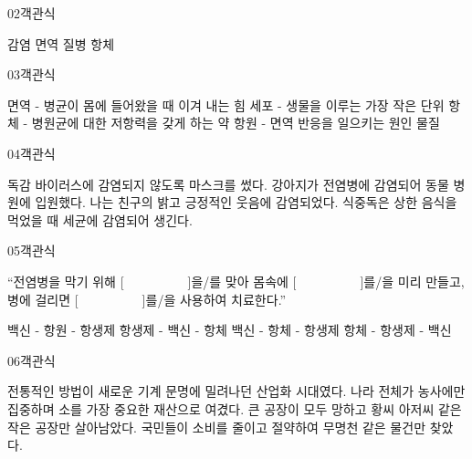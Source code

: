 \documentclass[fs95,seriesFre]{korfarm-base}
\begin{document}
\begin{kfQBlock}{02}{객관식}
\begin{kfChoices}
\kfChoice 감염
\kfChoice 면역
\kfChoice 질병
\kfChoice 항체
\end{kfChoices}
\end{kfQBlock}

\begin{kfQBlock}{03}{객관식}
\begin{kfChoices}
\kfChoice 면역 - 병균이 몸에 들어왔을 때 이겨 내는 힘
\kfChoice 세포 - 생물을 이루는 가장 작은 단위
\kfChoice 항체 - 병원균에 대한 저항력을 갖게 하는 약
\kfChoice 항원 - 면역 반응을 일으키는 원인 물질
\end{kfChoices}
\end{kfQBlock}

\begin{kfQBlock}{04}{객관식}
\begin{kfChoices}
\kfChoice 독감 바이러스에 감염되지 않도록 마스크를 썼다.
\kfChoice 강아지가 전염병에 감염되어 동물 병원에 입원했다.
\kfChoice 나는 친구의 밝고 긍정적인 웃음에 감염되었다.
\kfChoice 식중독은 상한 음식을 먹었을 때 세균에 감염되어 생긴다.
\end{kfChoices}
\end{kfQBlock}

\begin{kfQBlock}{05}{객관식}
\begin{kfEvidence}“전염병을 막기 위해 [　　　　　]을/를 맞아 몸속에 [　　　　　]를/을 미리 만들고, 병에 걸리면 [　　　　　]를/을 사용하여 치료한다.”\end{kfEvidence}
\begin{kfChoices}
\kfChoice 백신 - 항원 - 항생제
\kfChoice 항생제 - 백신 - 항체
\kfChoice 백신 - 항체 - 항생제
\kfChoice 항체 - 항생제 - 백신
\end{kfChoices}
\end{kfQBlock}

\begin{kfQBlock}{06}{객관식}
\begin{kfChoices}
\kfChoice 전통적인 방법이 새로운 기계 문명에 밀려나던 산업화 시대였다.
\kfChoice 나라 전체가 농사에만 집중하며 소를 가장 중요한 재산으로 여겼다.
\kfChoice 큰 공장이 모두 망하고 황씨 아저씨 같은 작은 공장만 살아남았다.
\kfChoice 국민들이 소비를 줄이고 절약하여 무명천 같은 물건만 찾았다.
\end{kfChoices}
\end{kfQBlock}
\end{document}
